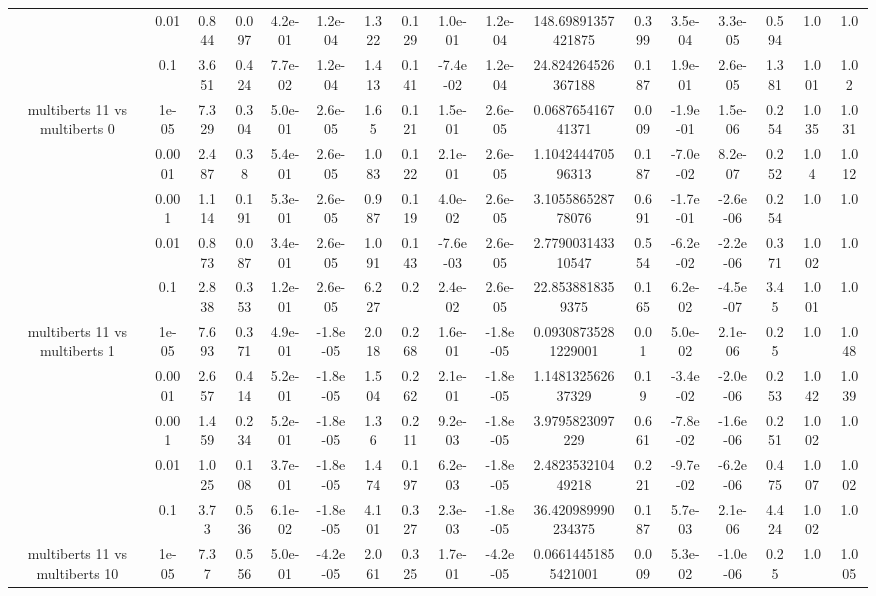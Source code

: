 \begin{tabular}{|c|c|c|c|c|c|c|c|c|c|c|c|c|c|c|c|c|}
 & 0.01 & 0.844 & 0.097 & 4.2e-01 & 1.2e-04 & 1.322 & 0.129 & 1.0e-01 & 1.2e-04 & 148.69891357421875 & 0.399 & 3.5e-04 & 3.3e-05 & 0.594 & 1.0 & 1.0 \\
 & 0.1 & 3.651 & 0.424 & 7.7e-02 & 1.2e-04 & 1.413 & 0.141 & -7.4e-02 & 1.2e-04 & 24.824264526367188 & 0.187 & 1.9e-01 & 2.6e-05 & 1.381 & 1.001 & 1.02 \\
\hline
\multirow{5}{*}{multiberts 11 vs multiberts 0} & 1e-05 & 7.329 & 0.304 & 5.0e-01 & 2.6e-05 & 1.65 & 0.121 & 1.5e-01 & 2.6e-05 & 0.068765416741371 & 0.009 & -1.9e-01 & 1.5e-06 & 0.254 & 1.035 & 1.031 \\
 & 0.0001 & 2.487 & 0.38 & 5.4e-01 & 2.6e-05 & 1.083 & 0.122 & 2.1e-01 & 2.6e-05 & 1.104244470596313 & 0.187 & -7.0e-02 & 8.2e-07 & 0.252 & 1.04 & 1.012 \\
 & 0.001 & 1.114 & 0.191 & 5.3e-01 & 2.6e-05 & 0.987 & 0.119 & 4.0e-02 & 2.6e-05 & 3.105586528778076 & 0.691 & -1.7e-01 & -2.6e-06 & 0.254 & 1.0 & 1.0 \\
 & 0.01 & 0.873 & 0.087 & 3.4e-01 & 2.6e-05 & 1.091 & 0.143 & -7.6e-03 & 2.6e-05 & 2.779003143310547 & 0.554 & -6.2e-02 & -2.2e-06 & 0.371 & 1.002 & 1.0 \\
 & 0.1 & 2.838 & 0.353 & 1.2e-01 & 2.6e-05 & 6.227 & 0.2 & 2.4e-02 & 2.6e-05 & 22.8538818359375 & 0.165 & 6.2e-02 & -4.5e-07 & 3.45 & 1.001 & 1.0 \\
\hline
\multirow{5}{*}{multiberts 11 vs multiberts 1} & 1e-05 & 7.693 & 0.371 & 4.9e-01 & -1.8e-05 & 2.018 & 0.268 & 1.6e-01 & -1.8e-05 & 0.09308735281229001 & 0.01 & 5.0e-02 & 2.1e-06 & 0.25 & 1.0 & 1.048 \\
 & 0.0001 & 2.657 & 0.414 & 5.2e-01 & -1.8e-05 & 1.504 & 0.262 & 2.1e-01 & -1.8e-05 & 1.148132562637329 & 0.19 & -3.4e-02 & -2.0e-06 & 0.253 & 1.042 & 1.039 \\
 & 0.001 & 1.459 & 0.234 & 5.2e-01 & -1.8e-05 & 1.36 & 0.211 & 9.2e-03 & -1.8e-05 & 3.9795823097229 & 0.661 & -7.8e-02 & -1.6e-06 & 0.251 & 1.002 & 1.0 \\
 & 0.01 & 1.025 & 0.108 & 3.7e-01 & -1.8e-05 & 1.474 & 0.197 & 6.2e-03 & -1.8e-05 & 2.482353210449218 & 0.221 & -9.7e-02 & -6.2e-06 & 0.475 & 1.007 & 1.002 \\
 & 0.1 & 3.73 & 0.536 & 6.1e-02 & -1.8e-05 & 4.101 & 0.327 & 2.3e-03 & -1.8e-05 & 36.420989990234375 & 0.187 & 5.7e-03 & 2.1e-06 & 4.424 & 1.002 & 1.0 \\
\hline
\multirow{5}{*}{multiberts 11 vs multiberts 10} & 1e-05 & 7.37 & 0.556 & 5.0e-01 & -4.2e-05 & 2.061 & 0.325 & 1.7e-01 & -4.2e-05 & 0.06614451855421001 & 0.009 & 5.3e-02 & -1.0e-06 & 0.25 & 1.0 & 1.005 \\

\end{tabular}
